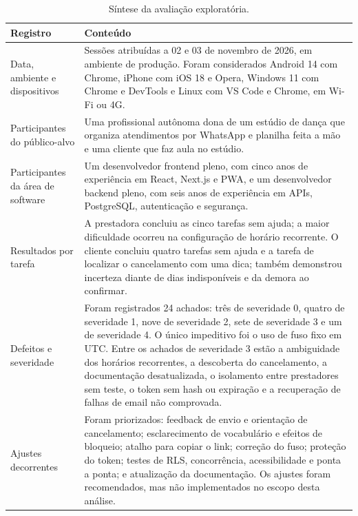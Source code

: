 \begin{table}[htbp]
\centering
\caption{Síntese da avaliação exploratória.}
\label{tab:avaliacao-resultados}
\small
\begin{tabularx}{\textwidth}{>{\RaggedRight\arraybackslash}p{4.6cm}Y}
\toprule
\textbf{Registro} & \textbf{Conteúdo} \\
\midrule
Data, ambiente e dispositivos & Sessões atribuídas a 02 e 03 de novembro de 2026, em ambiente de produção. Foram considerados Android 14 com Chrome, iPhone com iOS 18 e Opera, Windows 11 com Chrome e DevTools e Linux com VS Code e Chrome, em Wi-Fi ou 4G. \\
Participantes do público-alvo & Uma profissional autônoma dona de um estúdio de dança que organiza atendimentos por WhatsApp e planilha feita a mão e uma cliente que faz aula no estúdio. \\
Participantes da área de software & Um desenvolvedor frontend pleno, com cinco anos de experiência em React, Next.js e PWA, e um desenvolvedor backend pleno, com seis anos de experiência em APIs, PostgreSQL, autenticação e segurança. \\
Resultados por tarefa & A prestadora concluiu as cinco tarefas sem ajuda; a maior dificuldade ocorreu na configuração de horário recorrente. O cliente concluiu quatro tarefas sem ajuda e a tarefa de localizar o cancelamento com uma dica; também demonstrou incerteza diante de dias indisponíveis e da demora ao confirmar. \\
Defeitos e severidade & Foram registrados 24 achados: três de severidade 0, quatro de severidade 1, nove de severidade 2, sete de severidade 3 e um de severidade 4. O único impeditivo foi o uso de fuso fixo em UTC. Entre os achados de severidade 3 estão a ambiguidade dos horários recorrentes, a descoberta do cancelamento, a documentação desatualizada, o isolamento entre prestadores sem teste, o token sem hash ou expiração e a recuperação de falhas de email não comprovada. \\
Ajustes decorrentes & Foram priorizados: feedback de envio e orientação de cancelamento; esclarecimento de vocabulário e efeitos de bloqueio; atalho para copiar o link; correção do fuso; proteção do token; testes de RLS, concorrência, acessibilidade e ponta a ponta; e atualização da documentação. Os ajustes foram recomendados, mas não implementados no escopo desta análise. \\
\bottomrule
\end{tabularx}
\fontepropria
\end{table}

